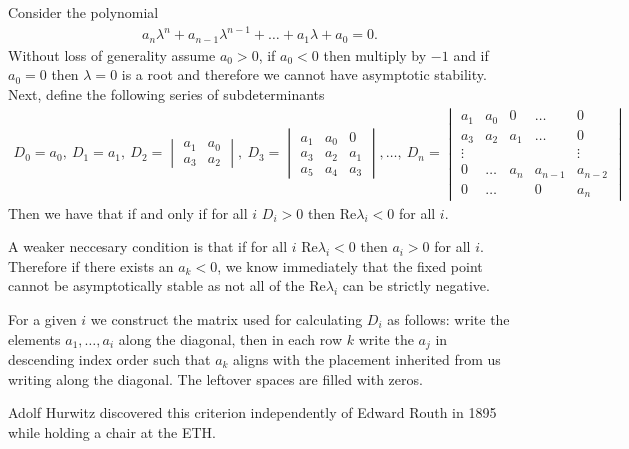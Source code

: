 \begin{theorem}
Consider the polynomial
\begin{align}
	a_n \lambda^{n} + a_{n-1} \lambda ^{n-1} + \ldots + a_{1} \lambda + a_0 = 0.
\end{align}
Without loss of generality assume $a_0 > 0$, if $a_0 <0$ then multiply by $-1$ and if $a_0=0$ then $\lambda =0$ is a root and therefore we cannot have asymptotic stability. Next, define the following series of subdeterminants
\begin{align}
	D_0 = a_0,\ D_1 =a_1,\ D_2 =
	\begin{vmatrix}
		a_1 & a_0 \\
		a_3 & a_2
	\end{vmatrix}
	,\ D_3 = 
	\begin{vmatrix}
		a_1 & a_0 & 0 \\
		a_3 & a_2 & a_1 \\
		a_5 & a_4 & a_3
	\end{vmatrix}
	,\ldots,\ D_n =
	\begin{vmatrix}
		a_1 & a_0 & 0 & \ldots & 0 \\
		a_3 & a_2 & a_1 & \ldots & 0 \\
		\vdots & & & & \vdots \\
		0 & \ldots &  a_n & a_{n-1} & a_{n-2}\\
		0 &  \ldots  & & 0  & a_n
	\end{vmatrix}
\end{align}
Then we have that if and only if for all $i$ $D_i >0$ then $ \textrm{Re} \lambda_i <0$ for all $i$.

A weaker neccesary condition is that if for all $i$ $ \textrm{Re} \lambda _i<0$ then $a_i >0$ for all $i$. Therefore if there exists an $a_k<0$, we know immediately that the fixed point cannot be asymptotically stable as not all of the $ \textrm{Re} \lambda _i $ can be strictly negative.
\end{theorem}
\begin{remark}[]
For a given $i$ we construct the matrix used for calculating $D_i$ as follows: write the elements $a_1,\ldots,a_i$ along the diagonal, then in each row $k$ write the $a_j$ in descending index order such that $a_k$ aligns with the placement inherited from us writing along the diagonal. The leftover spaces are filled with zeros. 
\end{remark}

\begin{remark}[]
	Adolf Hurwitz discovered this criterion independently of Edward Routh in 1895 while holding a chair at the ETH.
\end{remark}

